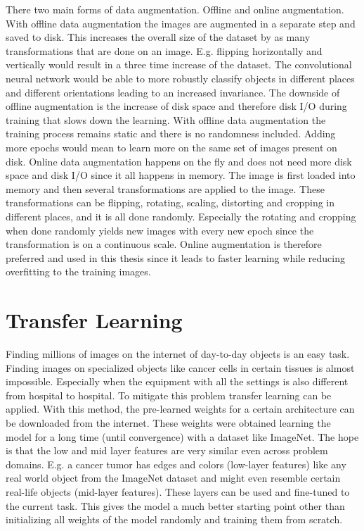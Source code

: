 There two main forms of data augmentation. Offline and online augmentation. With offline data augmentation the images are augmented in a separate step and saved to disk. This increases the overall size of the dataset by as many transformations that are done on an image. E.g. flipping horizontally and vertically would result in a three time increase of the dataset. The convolutional neural network would be able to more robustly classify objects in different places and different orientations leading to an increased invariance. The downside of offline augmentation is the increase of disk space and therefore disk I/O during training that slows down the learning. With offline data augmentation the training process remains static and there is no randomness included. Adding more epochs would mean to learn more on the same set of images present on disk.
Online data augmentation happens on the fly and does not need more disk space and disk I/O since it all happens in memory. The image is first loaded into memory and then several transformations are applied to the image. These transformations can be flipping, rotating, scaling, distorting and cropping in different places, and it is all done randomly. Especially the rotating and cropping when done randomly yields new images with every new epoch since the transformation is on a continuous scale. Online augmentation is therefore preferred and used in this thesis since it leads to faster learning while reducing overfitting to the training images.

\section{Transfer Learning}

Finding millions of images on the internet of day-to-day objects is an easy task. Finding images on specialized objects like cancer cells in certain tissues is almost impossible. Especially when the equipment with all the settings is also different from hospital to hospital. To mitigate this problem transfer learning can be applied. With this method, the pre-learned weights for a certain architecture can be downloaded from the internet. These weights were obtained learning the model for a long time (until convergence) with a dataset like ImageNet. The hope is that the low and mid layer features are very similar even across problem domains. E.g. a cancer tumor has edges and colors (low-layer features) like any real world object from the ImageNet dataset and might even resemble certain real-life objects (mid-layer features). These layers can be used and fine-tuned to the current task. This gives the model a much better starting point other than initializing all weights of the model randomly and training them from scratch. 

